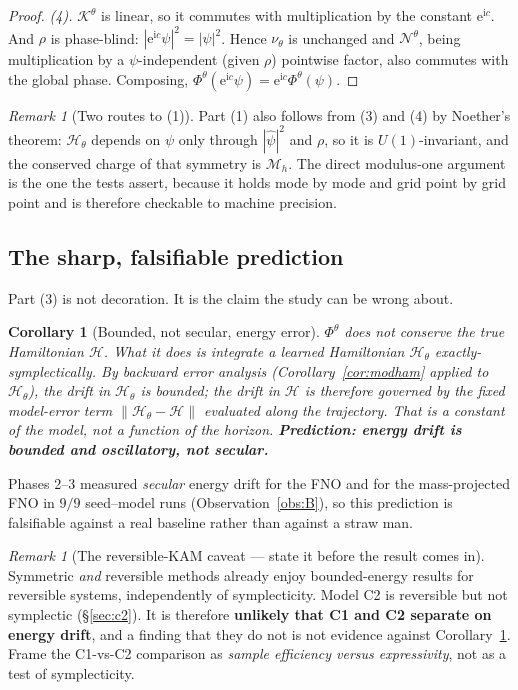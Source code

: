 \documentclass[11pt,a4paper]{article}
\theoremstyle{plain}
\newtheorem{corollary}[theorem]{Corollary}
\theoremstyle{definition}
\theoremstyle{remark}
\newtheorem{remark}[theorem]{Remark}
\newcommand{\iu}{\mathrm{i}}
\newcommand{\eu}{\mathrm{e}}
\newcommand{\Kop}{\mathcal{K}}
\newcommand{\Nop}{\mathcal{N}}
\newcommand{\Flow}{\Phi}
\newcommand{\Ham}{\mathcal{H}}
\newcommand{\Mass}{\mathcal{M}}
\begin{document}
\begin{proof}
\emph{(4).} $\Kop^\theta$ is linear, so it commutes with multiplication by the constant
$\eu^{\iu c}$. And $\rho$ is phase-blind: $|\eu^{\iu c}\psi|^2 = |\psi|^2$. Hence
$\nu_\theta$ is unchanged and $\Nop^\theta$, being multiplication by a $\psi$-independent
(given $\rho$) pointwise factor, also commutes with the global phase. Composing,
$\Flow^\theta(\eu^{\iu c}\psi) = \eu^{\iu c}\Flow^\theta(\psi)$.
\end{proof}

\begin{remark}[Two routes to (1)]
Part (1) also follows from (3) and (4) by Noether's theorem: $\Ham_\theta$ depends on
$\psi$ only through $|\widehat\psi|^2$ and $\rho$, so it is $U(1)$-invariant, and the
conserved charge of that symmetry is $\Mass_h$. The direct modulus-one argument is the
one the tests assert, because it holds mode by mode and grid point by grid point and is
therefore checkable to machine precision.
\end{remark}

\subsection{The sharp, falsifiable prediction}
\label{sec:sharpprediction}

Part (3) is not decoration. It is the claim the study can be wrong about.

\begin{corollary}[Bounded, not secular, energy error]
\label{cor:boundedenergy}
$\Flow^\theta$ does \emph{not} conserve the true Hamiltonian $\Ham$. What it does is
integrate a \emph{learned} Hamiltonian $\Ham_\theta$ exactly-symplectically. By backward
error analysis (Corollary~\ref{cor:modham} applied to $\Ham_\theta$), the drift in
$\Ham_\theta$ is bounded; the drift in $\Ham$ is therefore governed by the fixed
model-error term $\|\Ham_\theta - \Ham\|$ evaluated along the trajectory. That is a
constant of the model, not a function of the horizon. \textbf{Prediction: energy drift is
bounded and oscillatory, not secular.}
\end{corollary}

Phases 2--3 measured \emph{secular} energy drift for the FNO and for the mass-projected
FNO in $9/9$ seed--model runs (Observation~\ref{obs:B}), so this prediction is falsifiable
against a real baseline rather than against a straw man.

\begin{remark}[The reversible-KAM caveat --- state it before the result comes in]
\label{rem:kam}
Symmetric \emph{and} reversible methods already enjoy bounded-energy results for
reversible systems, independently of symplecticity. Model C2 is reversible but not
symplectic (\S\ref{sec:c2}). It is therefore \textbf{unlikely that C1 and C2 separate on
energy drift}, and a finding that they do not is not evidence against
Corollary~\ref{cor:boundedenergy}. Frame the C1-vs-C2 comparison as \emph{sample
efficiency versus expressivity}, not as a test of symplecticity.
\end{remark}
\end{document}
